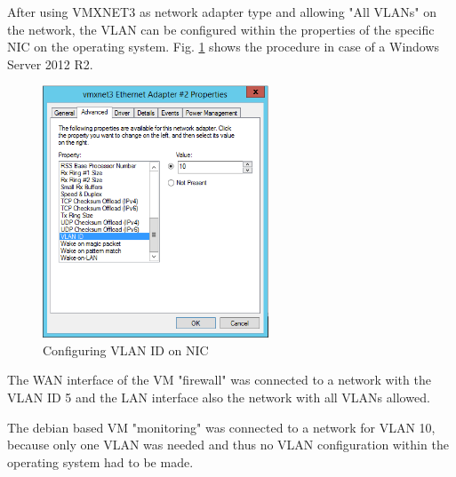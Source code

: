 After using VMXNET3 as network adapter type and allowing "All VLANs" on the network, the VLAN can be configured within the properties of the specific \ac{NIC} on the operating system. Fig. \ref{img:configuring_vlan_id_on_nic} shows the procedure in case of a Windows Server 2012 R2.

\begin{figure}[h!]
	\centering
	\includegraphics[width=0.6\textwidth]{BilderAllgemein/vmxnet3_properties.png}
	\caption{Configuring VLAN ID on NIC}
	\label{img:configuring_vlan_id_on_nic}
\end{figure}

The WAN interface of the VM "firewall" was connected to a network with the VLAN ID 5 and the LAN interface also the network with all VLANs allowed. 

The debian based VM "monitoring" was connected to a network for VLAN 10, because only one VLAN was needed and thus no VLAN configuration within the operating system had to be made.



